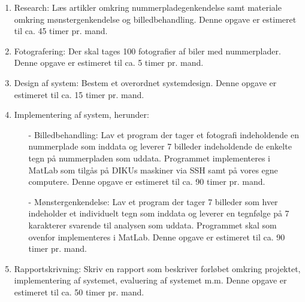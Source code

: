 \documentclass[10pt,a4paper,final]{report}
\begin{document}
\begin{enumerate}
\item Research: Læs artikler omkring nummerpladegenkendelse samt materiale omkring mønstergenkendelse og billedbehandling. Denne opgave er estimeret til ca. 45 timer pr. mand.

\item Fotografering: Der skal tages 100 fotografier af biler med nummerplader. Denne opgave er estimeret til ca. 5 timer pr. mand.

\item Design af system: Bestem et overordnet systemdesign. Denne opgave er estimeret til ca. 15 timer pr. mand.

\item Implementering af system, herunder:

\begin{itemize}
\item[-] Billedbehandling: Lav et program der tager et fotografi indeholdende en nummerplade som inddata og leverer 7 billeder indeholdende de enkelte tegn på nummerpladen som uddata. Programmet implementeres i MatLab som tilgås på DIKUs maskiner via SSH samt på vores egne computere. Denne opgave er estimeret til ca. 90 timer pr. mand.

\item[-] Mønstergenkendelse: Lav et program der tager 7 billeder som hver indeholder et individuelt tegn som inddata og leverer en tegnfølge på 7 karakterer svarende til analysen som uddata. Programmet skal som ovenfor implementeres i MatLab. Denne opgave er estimeret til ca. 90 timer pr. mand.

\end{itemize}
\item Rapportskrivning: Skriv en rapport som beskriver forløbet omkring projektet, implementering af systemet, evaluering af systemet m.m. Denne opgave er estimeret til ca. 50 timer pr. mand.


\end{enumerate}


\end{document}
